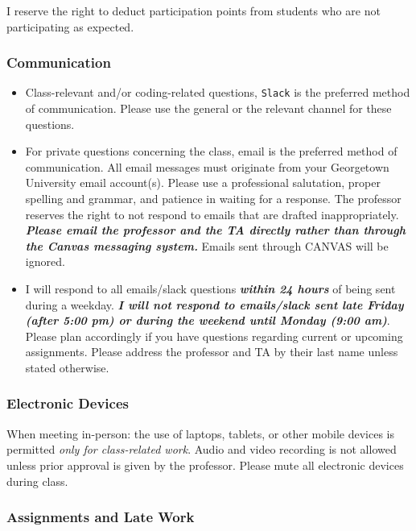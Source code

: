 \documentclass[
  12pt,
]{article}
\begin{document}
I reserve the right to deduct participation points from students who are
not participating as expected.

\hypertarget{communication}{%
\subsubsection{Communication}\label{communication}}

\begin{itemize}
\item
  Class-relevant and/or coding-related questions, \texttt{Slack} is the
  preferred method of communication. Please use the general or the
  relevant channel for these questions.
\item
  For private questions concerning the class, email is the preferred
  method of communication. All email messages must originate from your
  Georgetown University email account(s). Please use a professional
  salutation, proper spelling and grammar, and patience in waiting for a
  response. The professor reserves the right to not respond to emails
  that are drafted inappropriately. \textbf{\emph{Please email the
  professor and the TA directly rather than through the Canvas messaging
  system.}} Emails sent through CANVAS will be ignored.
\item
  I will respond to all emails/slack questions \textbf{\emph{within 24
  hours}} of being sent during a weekday. \textbf{\emph{I will not
  respond to emails/slack sent late Friday (after 5:00 pm) or during the
  weekend until Monday (9:00 am)}}. Please plan accordingly if you have
  questions regarding current or upcoming assignments. Please address
  the professor and TA by their last name unless stated otherwise.
\end{itemize}

\hypertarget{electronic-devices}{%
\subsubsection{Electronic Devices}\label{electronic-devices}}

When meeting in-person: the use of laptops, tablets, or other mobile
devices is permitted \emph{only for class-related work}. Audio and video
recording is not allowed unless prior approval is given by the
professor. Please mute all electronic devices during class.

\hypertarget{assignments-and-late-work}{%
\subsubsection{Assignments and Late
Work}\label{assignments-and-late-work}}
\end{document}
